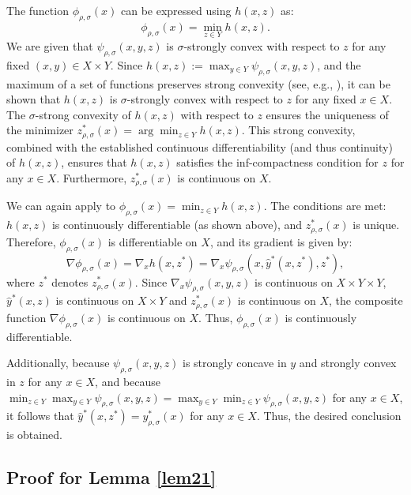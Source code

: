 \documentclass{article}
\def\z{z}
\begin{document}
The function $\phi_{\rho,\sigma}(x)$ can be expressed using $h(x,z)$ as:	\begin{equation}\label{lem1_eq1}
		\phi_{\rho,\sigma}(x) =  \min_{\z \in Y} h(x,z).
	\end{equation}
	We are given that $\psi_{\rho,\sigma}(x,y,z)$ is $\sigma$-strongly convex with respect to $z$ for any fixed $(x,y) \in X \times Y$. Since $h(x,z) := \max_{y \in Y} \psi_{\rho,\sigma}(x,y,z)$, and the maximum of a set of functions preserves strong convexity (see, e.g., \cite[Theorem 2.16]{beck2017first}), it can be shown that  $h(x,z)$ is $\sigma$-strongly convex with respect to $z$ for any fixed $x \in X$. The $\sigma$-strong convexity of $h(x,z)$ with respect to $z$ ensures the uniqueness of the minimizer $z_{\rho,\sigma}^*(x) = \arg \min_{z \in Y} h(x,z)$. This strong convexity, combined with the established continuous differentiability (and thus continuity) of $h(x,z)$, ensures that $h(x,z)$ satisfies the inf-compactness condition for $z$ for any $x \in X$. Furthermore, $z_{\rho,\sigma}^*(x)$ is continuous on $X$.

    We can again apply \cite[Theorem 4.13, Remark 4.14]{bonnans2013perturbation} to $\phi_{\rho,\sigma}(x) =  \min_{\z \in Y} h(x,z)$. The conditions are met: $h(x,z)$ is continuously differentiable (as shown above), and $z_{\rho,\sigma}^*(x)$ is unique.
    Therefore, $\phi_{\rho,\sigma}(x)$ is differentiable on $X$, and its gradient is given by:
	\[
	\nabla \phi_{\rho,\sigma}(x) =  \nabla_x h(x, z^*) =  \nabla_x \psi_{\rho,\sigma}(x,\widehat{y}^*(x,z^*),z^*),
	\]
	where $z^*$ denotes $z_{\rho,\sigma}^*(x)$. Since $\nabla_x \psi_{\rho,\sigma}(x,y,z)$ is continuous on $X \times Y \times Y$, $\widehat{y}^*(x,z)$ is continuous on $X \times Y$ and $z_{\rho,\sigma}^*(x)$ is continuous on $X$,  the composite function $\nabla \phi_{\rho,\sigma}(x)$ is continuous on $X$. Thus, $\phi_{\rho,\sigma}(x)$ is continuously differentiable.
    
    
    Additionally, because  $\psi_{\rho,\sigma}(x,y,z)$ is strongly concave in $y$ and strongly convex in $z$ for any $x \in X$, and because $\min_{z \in Y}\max_{y \in Y}\psi_{\rho,\sigma}(x,y,z) = \max_{y \in Y}\min_{z \in Y} \psi_{\rho,\sigma}(x,y,z)$ for any $x \in X$, it follows that $\widehat{y}^*(x,z^*) = y_{\rho,\sigma}^*(x)$ for any $x \in X$. Thus, the desired conclusion is obtained.

  

\subsection{Proof for Lemma \ref{lem21}}
\end{document}
